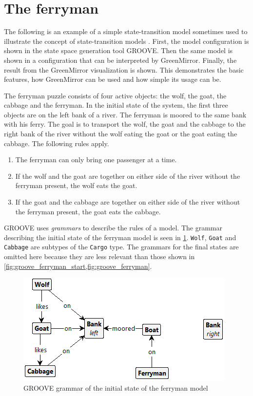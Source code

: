 \section{The ferryman}\label{sec:ferryman}
The following is an example of a simple state-transition model sometimes used to illustrate the concept of state-transition models \cite{huth2004}. First, the model configuration is shown in the state space generation tool GROOVE. Then the same model is shown in a configuration that can be interpreted by GreenMirror. Finally, the result from the GreenMirror visualization is shown. This demonstrates the basic features, how GreenMirror can be used and how simple its usage can be. 
\par The ferryman puzzle consists of four active objects: the wolf, the goat, the cabbage and the ferryman. In the initial state of the system, the first three objects are on the left bank of a river. The ferryman is moored to the same bank with his ferry. The goal is to transport the wolf, the goat and the cabbage to the right bank of the river without the wolf eating the goat or the goat eating the cabbage. The following rules apply.
\begin{enumerate}
\item The ferryman can only bring one passenger at a time.
\item If the wolf and the goat are together on either side of the river without the ferryman present, the wolf eats the goat.
\item If the goat and the cabbage are together on either side of the river without the ferryman present, the goat eats the cabbage.
\end{enumerate}
GROOVE uses \emph{grammars} to describe the rules of a model. The grammar describing the initial state of the ferryman model is seen in \cref{fig:groove_ferryman_start}. \texttt{Wolf}, \texttt{Goat} and \texttt{Cabbage} are subtypes of the \texttt{Cargo} type. The grammars for the final states are omitted here because they are less relevant than those shown in \cref{fig:groove_ferryman_start,fig:groove_ferryman}.
\begin{figure}[h]
\centering\includegraphics{images/groove_ferryman_start}
\caption{GROOVE grammar of the initial state of the ferryman model}\label{fig:groove_ferryman_start}
\end{figure}
